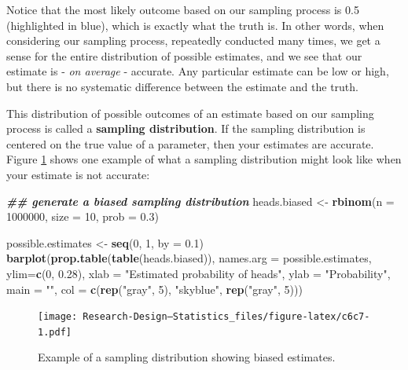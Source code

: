 \documentclass[
]{book}
\newenvironment{Shaded}{\begin{snugshade}}{\end{snugshade}}
\newcommand{\AttributeTok}[1]{\textcolor[rgb]{0.13,0.29,0.53}{#1}}
\newcommand{\DecValTok}[1]{\textcolor[rgb]{0.00,0.00,0.81}{#1}}
\newcommand{\DocumentationTok}[1]{\textcolor[rgb]{0.56,0.35,0.01}{\textbf{\textit{#1}}}}
\newcommand{\FloatTok}[1]{\textcolor[rgb]{0.00,0.00,0.81}{#1}}
\newcommand{\FunctionTok}[1]{\textcolor[rgb]{0.13,0.29,0.53}{\textbf{#1}}}
\newcommand{\NormalTok}[1]{#1}
\newcommand{\OtherTok}[1]{\textcolor[rgb]{0.56,0.35,0.01}{#1}}
\newcommand{\StringTok}[1]{\textcolor[rgb]{0.31,0.60,0.02}{#1}}
\begin{document}
Notice that the most likely outcome based on our sampling process is 0.5 (highlighted in blue), which is exactly what the truth is. In other words, when considering our sampling process, repeatedly conducted many times, we get a sense for the entire distribution of possible estimates, and we see that our estimate is - \emph{on average} - accurate. Any particular estimate can be low or high, but there is no systematic difference between the estimate and the truth.

This distribution of possible outcomes of an estimate based on our sampling process is called a \textbf{sampling distribution}. If the sampling distribution is centered on the true value of a parameter, then your estimates are accurate. Figure \ref{fig:c6c7} shows one example of what a sampling distribution might look like when your estimate is not accurate:

\begin{Shaded}
\begin{Highlighting}[]
\DocumentationTok{\#\# generate a biased sampling distribution}
\NormalTok{heads.biased }\OtherTok{\textless{}{-}} \FunctionTok{rbinom}\NormalTok{(}\AttributeTok{n =} \DecValTok{1000000}\NormalTok{, }\AttributeTok{size =} \DecValTok{10}\NormalTok{, }\AttributeTok{prob =} \FloatTok{0.3}\NormalTok{)}
      
\NormalTok{possible.estimates }\OtherTok{\textless{}{-}} \FunctionTok{seq}\NormalTok{(}\DecValTok{0}\NormalTok{, }\DecValTok{1}\NormalTok{, }\AttributeTok{by =} \FloatTok{0.1}\NormalTok{)}
\FunctionTok{barplot}\NormalTok{(}\FunctionTok{prop.table}\NormalTok{(}\FunctionTok{table}\NormalTok{(heads.biased)),}
        \AttributeTok{names.arg =}\NormalTok{ possible.estimates,}
        \AttributeTok{ylim=}\FunctionTok{c}\NormalTok{(}\DecValTok{0}\NormalTok{, }\FloatTok{0.28}\NormalTok{),}
        \AttributeTok{xlab =} \StringTok{"Estimated probability of heads"}\NormalTok{, }\AttributeTok{ylab =} \StringTok{"Probability"}\NormalTok{,}
        \AttributeTok{main =} \StringTok{""}\NormalTok{,}
        \AttributeTok{col =} \FunctionTok{c}\NormalTok{(}\FunctionTok{rep}\NormalTok{(}\StringTok{"gray"}\NormalTok{, }\DecValTok{5}\NormalTok{), }\StringTok{"skyblue"}\NormalTok{, }\FunctionTok{rep}\NormalTok{(}\StringTok{"gray"}\NormalTok{, }\DecValTok{5}\NormalTok{)))}
\end{Highlighting}
\end{Shaded}

\begin{figure}
\centering
\texttt{[image: Research-Design---Statistics\_files/figure-latex/c6c7-1.pdf]}
\caption{\label{fig:c6c7}Example of a sampling distribution showing biased estimates.}
\end{figure}
\end{document}
